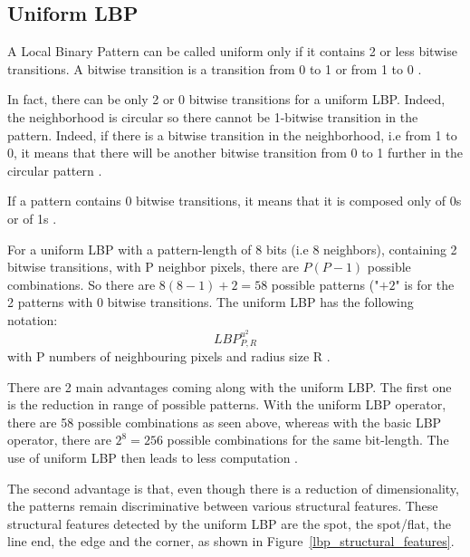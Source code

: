 \subsection{Uniform LBP}

\vspace{\baselineskip}
\noindent A Local Binary Pattern can be called uniform only if it contains 2 or less bitwise transitions. A bitwise transition is a transition from 0 to 1 or from 1 to 0 \cite{GAN08}. 
\newline

\noindent In fact, there can be only 2 or 0 bitwise transitions for a uniform LBP. Indeed, the neighborhood is circular so there cannot be 1-bitwise transition in the pattern. Indeed, if there is a bitwise transition in the neighborhood, i.e from 1 to 0, it means that there will be another bitwise transition from 0 to 1 further in the circular pattern \cite{GAN08}.
\newline

\noindent If a pattern contains 0 bitwise transitions, it means that it is composed only of 0s or of 1s \cite{GAN08}.
\newline

\noindent For a uniform LBP with a pattern-length of 8 bits (i.e 8 neighbors), containing 2 bitwise transitions, with P neighbor pixels, there are $ P(P - 1) $ possible combinations. So there are $ 8(8 - 1) + 2 =58 $ possible patterns ("$ + 2 $" is for the 2 patterns with 0 bitwise transitions. The uniform LBP has the following notation: \[ LBP_{P,R}^{u^2} \] with P numbers of neighbouring pixels and radius size R \cite{GAN08}.
\newline

\noindent There are 2 main advantages coming along with the uniform LBP. The first one is the reduction in range of possible patterns. With the uniform LBP operator, there are 58 possible combinations as seen above, whereas with the basic LBP operator, there are $ 2^8 = 256 $ possible combinations for the same bit-length. The use of uniform LBP then leads to less computation \cite{GAN08}.
\newline

\noindent The second advantage is that, even though there is a reduction of dimensionality, the patterns remain discriminative between various structural features. These structural features detected by the uniform LBP are the spot, the spot/flat, the line end, the edge and the corner, as shown in Figure~\ref{lbp_structural_features}.
\newline

